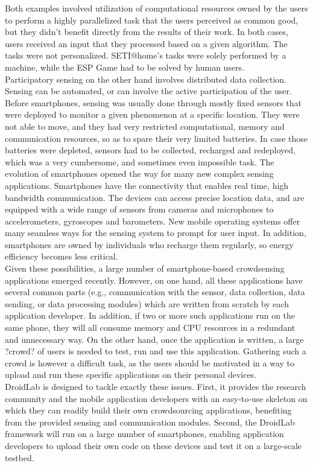 \documentclass[conference,letterpaper]{IEEEtran}
\begin{document}
\indent Both examples involved utilization of computational resources owned by the users to perform a highly parallelized task that the users perceived as common good, but they didn't benefit directly from the results of their work. In both cases, users received an input that they processed based on a given algorithm. The tasks were not personalized. SETI@home's tasks were solely performed by a machine, while the ESP Game had to be solved by human users. \\
\indent Participatory sensing on the other hand involves distributed data collection. Sensing can be automated, or can involve the active participation of the user. Before smartphones, sensing was usually done through mostly fixed sensors that were deployed to monitor a given phenomenon at a specific location. They were not able to move, and they had very restricted computational, memory and communication resources, so as to spare their very limited batteries. In case those batteries were depleted, sensors had to be collected, recharged and redeployed, which was a very cumbersome, and sometimes even impossible task. The evolution of smartphones opened the way for many new complex sensing applications. Smartphones have the connectivity that enables real time, high bandwidth communication. The devices can access precise location data, and are equipped with a wide range of sensors from cameras and microphones to accelerometers, gyroscopes and barometers. New mobile operating systems offer many seamless ways for the sensing system to prompt for user input. In addition, smartphones are owned by individuals who recharge them regularly, so energy efficiency becomes less critical.\\
\indent Given these possibilities, a large number of smartphone-based crowdsensing applications emerged recently. However, on one hand, all these applications have several common parts (e.g., communication with the sensor, data collection, data sending, or data processing modules) which are written from scratch by each application developer. In addition, if two or more such applications run on the same phone, they will all consume memory and CPU resources in a redundant and unnecessary way. On the other hand, once the application is written, a large ?crowd? of users is needed to test, run and use this application. Gathering such a crowd is however a difficult task, as the users should be motivated in a way to upload and run these specific applications on their personal devices.\\
\indent DroidLab is designed to tackle exactly these issues. First, it provides the research community and the mobile application developers with an easy-to-use skeleton on which they can readily build their own crowdsourcing applications, benefiting from the provided sensing and communication modules. Second, the DroidLab framework will run on a large number of smartphones, enabling application developers to upload their own code on these devices and test it on a large-scale testbed. 
\end{document}
